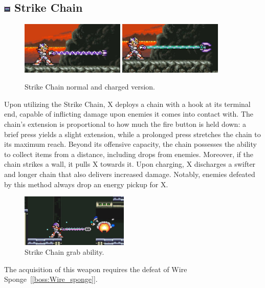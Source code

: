 \subsection{\includegraphics[width=12px, height=10px]{figures/X2/weapons/S_chain.png} Strike Chain}\label{Strike_chain}
\begin{figure}[htp]
	\centering
	\includegraphics[height=2.5cm]{figures/X2/weapons/S_chain_1.png}	
	\includegraphics[height=2.5cm]{figures/X2/weapons/S_chain_2.png}	
	\caption{Strike Chain normal and charged version.}
\end{figure}
Upon utilizing the Strike Chain, X deploys a chain with a hook at its terminal end, capable of inflicting damage upon enemies it comes into contact with. The chain's extension is proportional to how much the fire button is held down: a brief press yields a slight extension, while a prolonged press stretches the chain to its maximum reach. Beyond its offensive capacity, the chain possesses the ability to collect items from a distance, including drops from enemies. Moreover, if the chain strikes a wall, it pulls X towards it. Upon charging, X discharges a swifter and longer chain that also delivers increased damage. Notably, enemies defeated by this method always drop an energy pickup for X.

\begin{figure}[htp]
	\centering
	\includegraphics[height=2.5cm]{figures/X2/weapons/S_chain_grub.jpg}	
	\caption{Strike Chain grab ability.}
\end{figure}
The acquisition of this weapon requires the defeat of Wire Sponge~[\ref{boss:Wire_sponge}].

